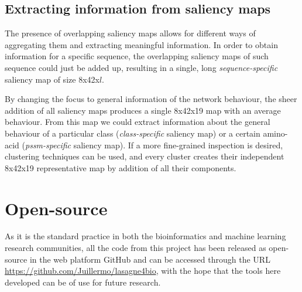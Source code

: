 \subsection{Extracting information from saliency maps}
The presence of overlapping saliency maps allows for different ways of aggregating them and extracting meaningful information. In order to obtain information for a specific sequence, the overlapping saliency maps of such sequence could just be added up, resulting in a single, long \textit{sequence-specific} saliency map of size 8x42x$l$.

By changing the focus to general information of the network behaviour, the sheer addition of all saliency maps produces a single 8x42x19 map with an average behaviour. From this map we could extract information about the general behaviour of a particular class (\textit{class-specific} saliency map) or a certain amino-acid (\textit{pssm-specific} saliency map). If a more fine-grained inspection is desired, clustering techniques can be used, and every cluster creates their independent 8x42x19 representative map by addition of all their components.





\section{Open-source}

As it is the standard practice in both the bioinformatics and machine learning research communities, all the code from this project has been released as open-source in the web platform GitHub and can be accessed through the URL \url{https://github.com/Juillermo/lasagne4bio}, with the hope that the tools here developed can be of use for future research.
